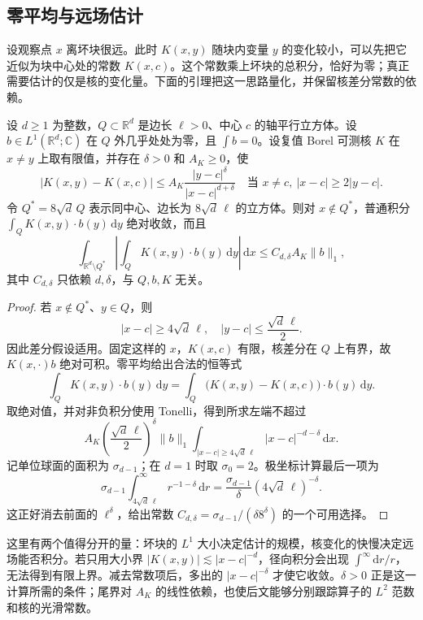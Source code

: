 \subsection{零平均与远场估计}
\label{b2:subsec:180202}

设观察点 \(x\) 离坏块很远。此时 \(K(x,y)\) 随块内变量 \(y\) 的变化较小，可以先把它近似为块中心处的常数 \(K(x,c)\)。这个常数乘上坏块的总积分，恰好为零；真正需要估计的仅是核的变化量。下面的引理把这一思路量化，并保留核差分常数的依赖。

\begin{lemma}\label{b2:thm:18-cancellation-tail}
设 \(d\geq1\) 为整数，\(Q\subset\mathbb R^d\) 是边长 \(\ell>0\)、中心 \(c\) 的轴平行立方体。设 \(b\in L^1(\mathbb R^d;\mathbb C)\) 在 \(Q\) 外几乎处处为零，且 \(\int b=0\)。设复值 Borel 可测核 \(K\) 在 \(x\ne y\) 上取有限值，并存在 \(\delta>0\) 和 \(A_K\geq0\)，使
\[
 |K(x,y)-K(x,c)|
 \leq A_K\frac{|y-c|^\delta}{|x-c|^{d+\delta}}
 \quad\text{当 }x\ne c,\ |x-c|\geq2|y-c|.
\]
令 \(Q^*=8\sqrt d\,Q\) 表示同中心、边长为 \(8\sqrt d\,\ell\) 的立方体。则对 \(x\notin Q^*\)，普通积分 \(\int_QK(x,y)\cdot b(y)\,\mathrm dy\) 绝对收敛，而且
\[
 \int_{\mathbb R^d\setminus Q^*}
 \left|\int_QK(x,y)\cdot b(y)\,\mathrm dy\right|\,\mathrm dx
 \leq C_{d,\delta}A_K\|b\|_1,
\]
其中 \(C_{d,\delta}\) 只依赖 \(d,\delta\)，与 \(Q,b,K\) 无关。
\end{lemma}
\begin{proof}
若 \(x\notin Q^*\)、\(y\in Q\)，则
\[
 |x-c|\geq4\sqrt d\,\ell,
 \quad |y-c|\leq\frac{\sqrt d\,\ell}{2}.
\]
因此差分假设适用。固定这样的 \(x\)，\(K(x,c)\) 有限，核差分在 \(Q\) 上有界，故 \(K(x,\cdot)b\) 绝对可积。零平均给出合法的恒等式
\[
 \int_QK(x,y)\cdot b(y)\,\mathrm dy
 =\int_Q\bigl(K(x,y)-K(x,c)\bigr)\cdot b(y)\,\mathrm dy.
\]
取绝对值，并对非负积分使用 Tonelli，得到所求左端不超过
\[
 A_K\left(\frac{\sqrt d\,\ell}{2}\right)^\delta\|b\|_1
 \int_{|x-c|\geq4\sqrt d\,\ell}|x-c|^{-d-\delta}\,\mathrm dx.
\]
记单位球面的面积为 \(\sigma_{d-1}\)；在 \(d=1\) 时取 \(\sigma_0=2\)。极坐标计算最后一项为
\[
 \sigma_{d-1}\int_{4\sqrt d\,\ell}^\infty r^{-1-\delta}\,\mathrm dr
 =\frac{\sigma_{d-1}}\delta(4\sqrt d\,\ell)^{-\delta}.
\]
这正好消去前面的 \(\ell^\delta\)，给出常数
\(C_{d,\delta}=\sigma_{d-1}/(\delta8^\delta)\) 的一个可用选择。
\end{proof}
这里有两个值得分开的量：坏块的 \(L^1\) 大小决定估计的规模，核变化的快慢决定远场能否积分。若只用大小界 \(|K(x,y)|\lesssim|x-c|^{-d}\)，径向积分会出现 \(\int^\infty\mathrm dr/r\)，无法得到有限上界。减去常数项后，多出的 \(|x-c|^{-\delta}\) 才使它收敛。\(\delta>0\) 正是这一计算所需的条件；尾界对 \(A_K\) 的线性依赖，也使后文能够分别跟踪算子的 \(L^2\) 范数和核的光滑常数。

